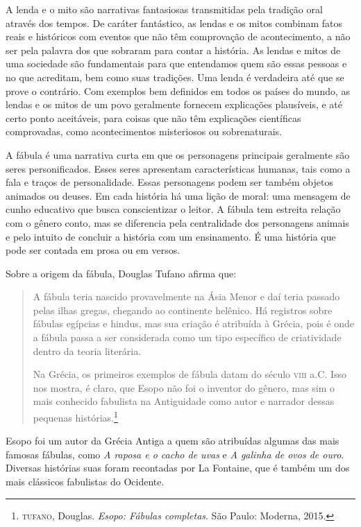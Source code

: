 \documentclass[11pt]{extarticle}
\begin{document}
A lenda e o mito são narrativas fantasiosas transmitidas pela tradição oral através dos tempos. De caráter fantástico, as lendas e os mitos combinam fatos reais e históricos com eventos que não têm comprovação de acontecimento, a não ser pela palavra dos que sobraram para contar a história. As lendas e mitos de uma sociedade são fundamentais para que entendamos quem são essas pessoas e no que acreditam, bem como suas tradições. Uma lenda é verdadeira até que se prove o contrário. Com exemplos bem definidos em todos os países do mundo, as lendas e os mitos de um povo geralmente fornecem explicações plausíveis, e até certo ponto aceitáveis, para coisas que não têm explicações científicas comprovadas, como acontecimentos misteriosos ou sobrenaturais.

A fábula é uma narrativa curta em que os personagens principais geralmente são seres personificados. Esses seres apresentam características humanas, tais como a fala e traços de personalidade. Essas personagens podem ser também objetos animados ou deuses. Em cada história há uma lição de moral: uma mensagem de cunho educativo que busca conscientizar o leitor. A fábula tem estreita relação com o gênero conto, mas se diferencia pela centralidade dos personagens animais e pelo intuito de concluir a história com um ensinamento. É uma história que pode ser contada em prosa ou em versos. 

Sobre a origem da fábula, Douglas Tufano afirma que:

\begin{quote}
A fábula teria nascido provavelmente na Ásia Menor e daí teria passado pelas ilhas gregas, chegando ao continente helênico. Há registros sobre fábulas egípcias e hindus, mas sua criação é atribuída à Grécia, pois é onde a fábula passa a ser considerada como um tipo específico de criatividade dentro da teoria literária. 

Na Grécia, os primeiros exemplos de fábula datam do século \textsc{viii} a.C. Isso nos mostra, é claro, que Esopo não foi o inventor do gênero, mas sim o mais conhecido fabulista na Antiguidade como autor e narrador dessas pequenas histórias.\footnote{\textsc{tufano}, Douglas. \textit{Esopo: Fábulas completas}. São Paulo: Moderna, 2015.}
\end{quote}

Esopo foi um autor da Grécia Antiga a quem são atribuídas algumas das mais famosas fábulas, como \textit{A raposa e o cacho de uvas} e \textit{A galinha de ovos de ouro}. Diversas  histórias suas foram recontadas por La Fontaine, que é também um dos mais clássicos fabulistas do Ocidente.
\end{document}
